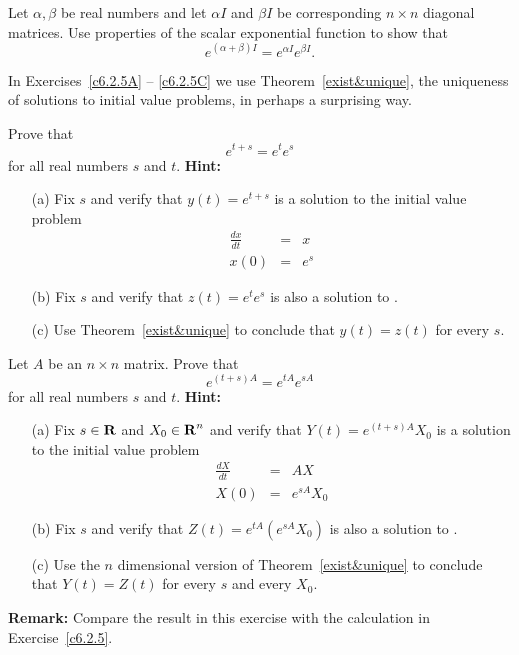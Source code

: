 \begin{exercise} \label{c6.2.5}
Let $\alpha,\beta$ be real numbers and let $\alpha I$ and $\beta
I$ be corresponding $n\times n$ diagonal matrices.  Use
properties of the scalar exponential function to show that
\[
     e^{(\alpha + \beta)I} = e^{\alpha I}e^{\beta I}.
\]
\end{exercise}

\noindent In Exercises~\ref{c6.2.5A} -- \ref{c6.2.5C} we use
Theorem~\ref{exist&unique}, the uniqueness of solutions to initial value
problems, in perhaps a surprising way.
\begin{exercise}  \label{c6.2.5A}
Prove that
\[
e^{t+s} = e^te^s
\]
for all real numbers $s$ and $t$.  {\bf Hint:}
\begin{itemize}
\item[(a)]  Fix $s$ and verify that $y(t) = e^{t+s}$ is a solution to the
initial value problem
\begin{equation}  \label{E:init1}
\begin{array}{rcl}
\frac{dx}{dt} & = & x \\
x(0) & = & e^s
\end{array}
\end{equation}
\item[(b)] Fix $s$ and verify that $z(t) = e^te^s$ is also a solution to
.
\item[(c)]  Use Theorem~\ref{exist&unique} to conclude that $y(t)=z(t)$ for
every $s$.
\end{itemize}
\end{exercise}
\begin{exercise}  \label{c6.2.5B}
Let $A$ be an $n\times n$ matrix.  Prove that
\[
e^{(t+s)A} = e^{tA}e^{sA}
\]
for all real numbers $s$ and $t$.  {\bf Hint:}
\begin{itemize}
\item[(a)]  Fix $s\in\mbox{$\bf{R}$}$ and $X_0\in\mbox{$\bf{R}$}^n$ and verify that
$Y(t) = e^{(t+s)A}X_0$ is a solution to the initial value problem
\begin{equation}  \label{E:init2}
\begin{array}{rcl}
\frac{dX}{dt} & = & AX \\
X(0) & = & e^{sA}X_0
\end{array}
\end{equation}
\item[(b)] Fix $s$ and verify that $Z(t) = e^{tA}\left(e^{sA}X_0\right)$ is
also a solution to .
\item[(c)]  Use the $n$ dimensional version of Theorem~\ref{exist&unique} to
conclude that $Y(t)=Z(t)$ for every $s$ and every $X_0$.
\end{itemize}
{\bf Remark:}  Compare the result in this exercise with the calculation in
Exercise~\ref{c6.2.5}.
\end{exercise}
